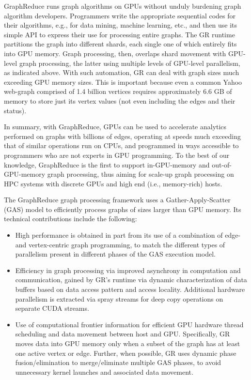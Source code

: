 GraphReduce runs graph algorithms on GPUs without unduly burdening graph algorithm developers. 
Programmers write the appropriate sequential codes for their algorithms, e.g., for data mining, machine learning, etc.,
and then use its simple API to express their use for processing entire graphs. The GR runtime partitions the
graph into different shards, each single one of which entirely fits into GPU memory. Graph processing, then, 
overlaps shard movement with GPU-level graph processing, the latter using multiple levels of GPU-level parallelism,
as indicated above. With such automation, GR can deal with graph sizes much exceeding GPU memory sizes. This is
important because even a common Yahoo web-graph comprised of 1.4 billion vertices \cite{yahoo} requires approximately 
6.6 GB of memory to store just its vertex values (not even including the edges and their status). 

In summary, with GraphReduce, GPUs can be used to accelerate analytics performed on graphs with billions of edges, 
operating at speeds much exceeding that of similar operations run on CPUs, and programmed in ways accessible 
to programmers who are not experts in GPU programming. To the best of our knowledge, GraphReduce is the first
to support in-GPU-memory and out-of-GPU-memory graph processing, thus aiming for scale-up graph processing 
on HPC systems with discrete GPUs and high end (i.e., memory-rich) hosts.

The GraphReduce graph processing framework uses a Gather-Apply-Scatter (GAS) model to efficiently
process graphs of sizes larger than GPU memory. Its technical contributions include the following:
\begin{itemize}
  \item High performance is obtained in part from its use of a combination of edge- and vertex-centric graph programming, 
to match the different types of parallelism present in different phases of the GAS execution model. 
  \item Efficiency in graph processing via improved asynchrony in computation and communication, gained
by GR's runtime via dynamic characterization of data buffers based on data access pattern and access locality.
Additional hardware parallelism is extracted via spray streams for deep copy operations on separate CUDA streams.
  \item Use of computational frontier information for efficient GPU hardware thread scheduling and data movement 
between host and GPU. Specifically, GR moves data into GPU memory only when a subset of the graph has at least 
one active vertex or edge. Further, when possible, GR uses dynamic phase fusion/elimination to merge/eliminate multiple GAS phases,
to avoid unnecessary kernel launches and associated data movement. 
\end{itemize}


